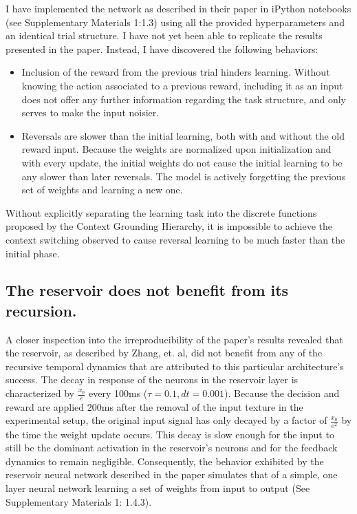 \documentclass[11pt]{article}
\begin{document}
I have implemented the network as described in their paper in iPython notebooks (see Supplementary Materials 1:1.3) using all the provided hyperparameters and an identical trial structure.  I have not yet been able to replicate the results presented in the paper.  Instead, I have discovered the following behaviors:
\begin{itemize}
\item  Inclusion of the reward from the previous trial hinders learning.  Without knowing the action associated to a previous reward, including it as an input does not offer any further information regarding the task structure, and only serves to make the input noisier.
\item Reversals are slower than the initial learning, both with and without the old reward input.  Because the weights are normalized upon initialization and with every update, the initial weights do not cause the initial learning to be any slower than later reversals.  The model is actively forgetting the previous set of weights and learning a new one.
\end{itemize}
Without explicitly separating the learning task into the discrete functions proposed by the Context Grounding Hierarchy, it is impossible to achieve the context switching observed to cause reversal learning to be much faster than the initial phase.

\subsection{The reservoir does not benefit from its recursion.} \label{not_reservoir}
A closer inspection into the irreproducibility of the paper's results revealed that the reservoir, as described by Zhang, et. al, did not benefit from any of the recursive temporal dynamics that are attributed to this particular architecture's success.  The decay in response of the neurons in the reservoir layer is characterized by $\frac{x_0}{e}$ every 100ms ($\tau=0.1, dt=0.001$).  Because the decision and reward are applied 200ms after the removal of the input texture in the experimental setup, the original input signal has only decayed by a factor of $\frac{x_0}{e^2}$ by the time the weight update occurs.  This decay is slow enough for the input to still be the dominant activation in the reservoir's neurons and for the feedback dynamics to remain negligible.  Consequently, the behavior exhibited by the reservoir neural network described in the paper simulates that of a simple, one layer neural network learning a set of weights from input to output (See Supplementary Materials 1: 1.4.3).
\end{document}
